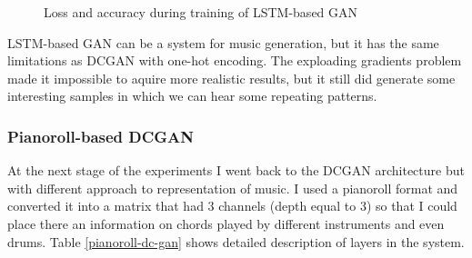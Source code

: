 \documentclass[]{article}
\begin{document}
\begin{figure}[!h]
	\centering
	\caption{Loss and accuracy during training of LSTM-based GAN}
\end{figure}

LSTM-based GAN can be a system for music generation, but it has the same limitations as DCGAN with one-hot encoding. The exploading gradients problem made it impossible to aquire more realistic results, but it still did generate some interesting samples in which we can hear some repeating patterns. 

\subsubsection{Pianoroll-based DCGAN}

At the next stage of the experiments I went back to the DCGAN architecture but with different approach to representation of music. I used a pianoroll format and converted it into a matrix that had 3 channels (depth equal to 3) so that I could place there an information on chords played by different instruments and even drums. Table \ref{pianoroll-dc-gan} shows detailed description of layers in the system.
\end{document}
